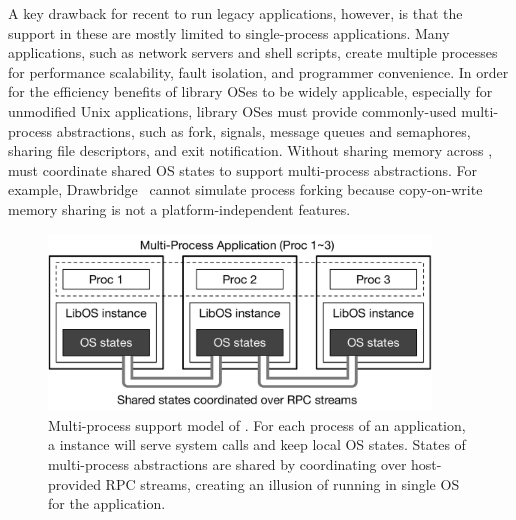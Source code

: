 
A key drawback for recent \liboses{} to run legacy applications, however,
is that the support in these \liboses{} are mostly limited to single-process applications.
Many applications, such as network servers and
shell scripts,
create multiple processes
for
performance scalability, fault isolation, and programmer convenience.
In order for the efficiency benefits of library OSes to be widely applicable,
especially for unmodified Unix applications,
library OSes must provide commonly-used multi-process abstractions,
such as fork,  signals, \sysvipc{} message queues and semaphores, sharing file descriptors, and exit notification.
Without sharing memory across \picoprocs{},
\libos{} must coordinate shared OS states to support multi-process abstractions.
For example, Drawbridge~\citep{porter11drawbridge} cannot simulate process forking because copy-on-write memory sharing is not a platform-independent features.


\begin{figure}[t!]
\centering
\includegraphics[width=4in]{graphene/figures/concept.pdf}
\caption[Multi-process support model of \sysname{} \libos{}]
{Multi-process support model of \sysname{} \libos{}. For each process of an application, a \libos{} instance will serve system calls and keep local OS states. States of multi-process abstractions are shared by coordinating over host-provided RPC streams, creating an illusion of running in single OS for the application.}
\label{fig:graphene:concept}
\end{figure}

